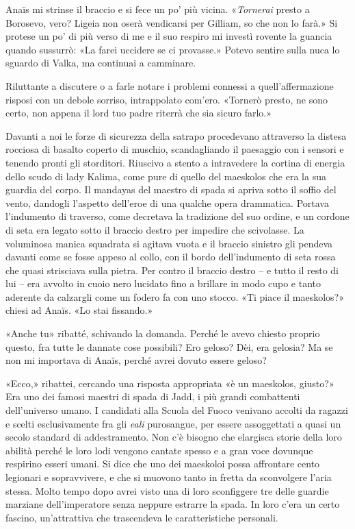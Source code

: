 Anaïs mi strinse il braccio e si fece un po' più vicina.
«\emph{Tornerai} presto a Borosevo, vero? Ligeia non oserà vendicarsi
per Gilliam, so che non lo farà.» Si protese un po' di più verso di me e
il suo respiro mi investì rovente la guancia quando sussurrò: «La farei
uccidere se ci provasse.» Potevo sentire sulla nuca lo sguardo di Valka,
ma continuai a camminare.

Riluttante a discutere o a farle notare i problemi connessi a
quell'affermazione risposi con un debole sorriso, intrappolato com'ero.
«Tornerò presto, ne sono certo, non appena il lord tuo padre riterrà che
sia sicuro farlo.»

Davanti a noi le forze di sicurezza della satrapo procedevano attraverso
la distesa rocciosa di basalto coperto di muschio, scandagliando il
paesaggio con i sensori e tenendo pronti gli storditori. Riuscivo a
stento a intravedere la cortina di energia dello scudo di lady Kalima,
come pure di quello del maeskolos che era la sua guardia del corpo. Il
mandayas del maestro di spada si apriva sotto il soffio del vento,
dandogli l'aspetto dell'eroe di una qualche opera drammatica. Portava
l'indumento di traverso, come decretava la tradizione del suo ordine, e
un cordone di seta era legato sotto il braccio destro per impedire che
scivolasse. La voluminosa manica squadrata si agitava vuota e il braccio
sinistro gli pendeva davanti come se fosse appeso al collo, con il bordo
dell'indumento di seta rossa che quasi strisciava sulla pietra. Per
contro il braccio destro -- e tutto il resto di lui -- era avvolto in
cuoio nero lucidato fino a brillare in modo cupo e tanto aderente da
calzargli come un fodero fa con uno stocco. «Ti piace il maeskolos?»
chiesi ad Anaïs. «Lo stai fissando.»

«Anche tu» ribatté, schivando la domanda. Perché le avevo chiesto
proprio questo, fra tutte le dannate cose possibili? Ero geloso? Dèi,
era gelosia? Ma se non mi importava di Anaïs, perché avrei dovuto essere
geloso?

«Ecco,» ribattei, cercando una risposta appropriata «è un maeskolos,
giusto?» Era uno dei famosi maestri di spada di Jadd, i più grandi
combattenti dell'universo umano. I candidati alla Scuola del Fuoco
venivano accolti da ragazzi e scelti esclusivamente fra gli \emph{eali}
purosangue, per essere assoggettati a quasi un secolo standard di
addestramento. Non c'è bisogno che elargisca storie della loro abilità
perché le loro lodi vengono cantate spesso e a gran voce dovunque
respirino esseri umani. Si dice che uno dei maeskoloi possa affrontare
cento legionari e sopravvivere, e che si muovono tanto in fretta da
sconvolgere l'aria stessa. Molto tempo dopo avrei visto una di loro
sconfiggere tre delle guardie marziane dell'imperatore senza neppure
estrarre la spada. In loro c'era un certo fascino, un'attrattiva che
trascendeva le caratteristiche personali.

